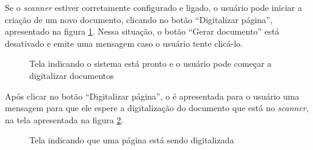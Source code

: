 Se o {\it scanner} estiver corretamente configurado e ligado, o usuário pode iniciar a criação de um novo documento, clicando no botão ``Digitalizar página'', apresentado na figura \ref{fig:dig_3}. Nessa situação, o botão ``Gerar documento'' está desativado e emite uma mensagem caso o usuário tente clicá-lo.

\begin{figure}[h]
 \centering
    \setlength\fboxsep{0pt}
    \setlength\fboxrule{0.5pt}
  \caption {Tela indicando o sistema está pronto e o usuário pode começar a digitalizar documentos}
  \label{fig:dig_3}
\end{figure}

Após clicar no botão ``Digitalizar página'', o é apresentada para o usuário uma mensagem para que ele espere a digitalização do documento que está no {\it scanner}, na tela apresentada na figura \ref{fig:dig_4}.

\begin{figure}[h]
 \centering
    \setlength\fboxsep{0pt}
    \setlength\fboxrule{0.5pt}
  \caption {Tela indicando que uma página está sendo digitalizada}
  \label{fig:dig_4}
\end{figure}

